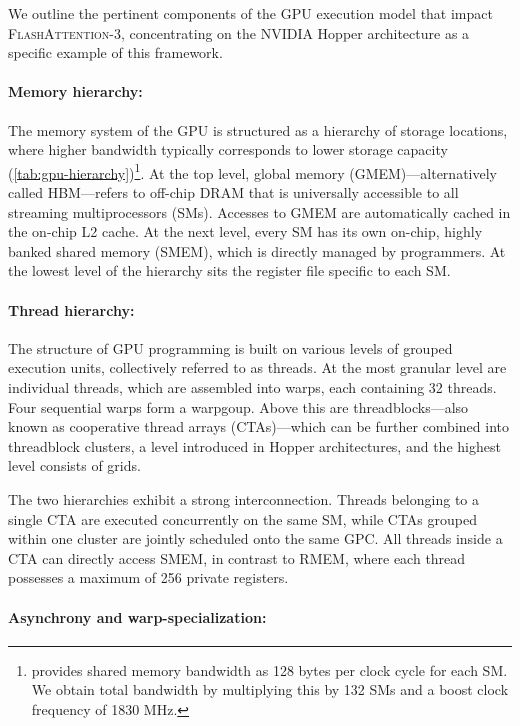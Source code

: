 We outline the pertinent components of the GPU execution model that impact \textsc{FlashAttention-3}, concentrating on the NVIDIA Hopper architecture as a specific example of this framework.

\paragraph{Memory hierarchy:} The memory system of the GPU is structured as a hierarchy of storage locations, where higher bandwidth typically corresponds to lower storage capacity (\cref{tab:gpu-hierarchy})\footnote{\citet{luo2024benchmarking} provides shared memory bandwidth as 128 bytes per clock cycle for each SM. We obtain total bandwidth by multiplying this by 132 SMs and a boost clock frequency of 1830 MHz.}. At the top level, global memory (GMEM)—alternatively called HBM—refers to off-chip DRAM that is universally accessible to all streaming multiprocessors (SMs). Accesses to GMEM are automatically cached in the on-chip L2 cache. At the next level, every SM has its own on-chip, highly banked shared memory (SMEM), which is directly managed by programmers. At the lowest level of the hierarchy sits the register file specific to each SM.

\paragraph{Thread hierarchy:} The structure of GPU programming is built on various levels of grouped execution units, collectively referred to as threads. At the most granular level are individual threads, which are assembled into warps, each containing 32 threads. Four sequential warps form a warpgoup. Above this are threadblocks—also known as cooperative thread arrays (CTAs)—which can be further combined into threadblock clusters, a level introduced in Hopper architectures, and the highest level consists of grids.

The two hierarchies exhibit a strong interconnection. Threads belonging to a single CTA are executed concurrently on the same SM, while CTAs grouped within one cluster are jointly scheduled onto the same GPC. All threads inside a CTA can directly access SMEM, in contrast to RMEM, where each thread possesses a maximum of 256 private registers.

\paragraph{Asynchrony and warp-specialization:}

